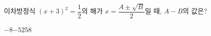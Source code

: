 이차방정식 $(x+3)^2=\dfrac{1}{2}$의 해가 $x=\dfrac{A\pm\sqrt{B}}{2}$일 때, $A-B$의 값은? 
\begin{choices32}{$-8$}{$-5$}{$2$}{$5$}{$8$}\end{choices32}
